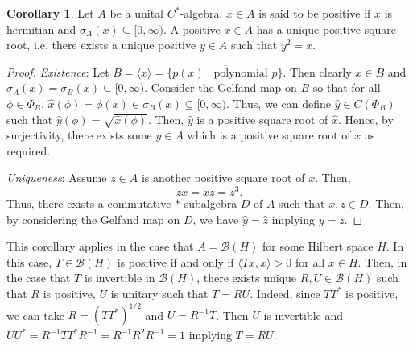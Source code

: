 \documentclass[]{article}
\theoremstyle{definition}
\newtheorem{corollary}{Corollary}[theorem]
\begin{document}
\begin{corollary}
  Let \(A\) be a unital \(C^*\)-algebra. \(x \in A\) is said to be positive if \(x\) is hermitian and 
  \(\sigma_A(x) \subseteq [0, \infty)\). A positive \(x \in A\) has a unique positive square root, i.e. 
  there exists a unique positive \(y \in A\) such that \(y^2 = x\).  
\end{corollary}
\begin{proof}
  \textit{Existence}: Let \(B = \langle x \rangle = \overline{\{p(x) \mid \text{polynomial } p\}}\).
  Then clearly \(x \in B\) and \(\sigma_A(x) = \sigma_B(x) \subseteq [0, \infty)\). Consider the Gelfand 
  map on \(B\) so that for all \(\phi \in \Phi_B\), \(\hat x(\phi) = \phi(x) \in \sigma_B(x) \subseteq [0, \infty)\).
  Thus, we can define \(\hat y \in C(\Phi_B)\) such that \(\hat y(\phi) = \sqrt{\hat x(\phi)}\). Then, 
  \(\hat y\) is a positive square root of \(\hat x\). Hence, by surjectivity, there exists some 
  \(y \in A\) which is a positive square root of \(x\) as required.

  \textit{Uniqueness}: Assume \(z \in A\) is another positive square root of \(x\). Then, 
  \[zx = xz = z^3.\]
  Thus, there exists a commutative \(*\)-subalgebra \(D\) of \(A\) such that \(x, z \in D\). Then, 
  by considering the Gelfand map on \(D\), we have \(\hat y = \hat z\) implying \(y = z\).
\end{proof}

This corollary applies in the case that \(A = \mathcal{B}(H)\) for some Hilbert space \(H\). 
In this case, \(T \in \mathcal{B}(H)\) is positive if and only if \(\langle Tx, x\rangle > 0\) 
for all \(x \in H\). Then, in the case that \(T\) is invertible in \(\mathcal{B}(H)\), 
there exists unique \(R, U \in \mathcal{B}(H)\)
such that \(R\) is positive, \(U\) is unitary such that \(T = RU\). Indeed, since \(TT^*\) is 
positive, we can take \(R = (TT^*)^{1 / 2}\) and \(U = R^{-1} T\). Then \(U\) is invertible 
and \(UU^* = R^{-1} TT^* R^{-1} = R^{-1} R^2 R^{-1} = 1\) implying \(T = RU\).
\end{document}

